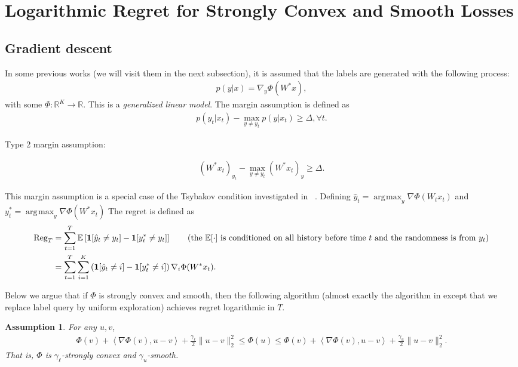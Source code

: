 \documentclass{article}
\newcommand{\Reg}{\text{\rm Reg}}
\newcommand{\one}{\boldsymbol{1}}
\newcommand{\nb}{\nabla}
\newcommand{\field}[1]{\mathbb{#1}}
\newcommand{\E}{\field{E}}
\newcommand{\inner}[1]{ \left\langle {#1} \right\rangle }
\newtheorem{assumption}{Assumption}
\DeclareMathOperator*{\argmax}{\arg\!\max}
\begin{document}
\section{Logarithmic Regret for Strongly Convex and Smooth Losses}
\subsection{Gradient descent}
In some previous works (we will visit them in the next subsection), it is assumed that the labels are generated with the following process: 
\begin{align}
    p(y|x) = \nabla_y\Phi(W^*x), 
\end{align}
with some $\Phi: \mathbb{R}^K \rightarrow \mathbb{R}$. This is a \textit{generalized linear model}.  
The margin assumption is defined as 
\begin{align}
    p(y_t|x_t) - \max_{y\neq y_t}p(y|x_t) \geq \Delta, \forall t.  \label{eqn:new margin}
\end{align}

{\color{blue} Type 2 margin assumption: }\\
{\color{blue} 
\begin{align}
    (W^*x_t)_{y_t} - \max_{y\neq y_t}(W^*x_t)_{y} \geq \Delta. 
\end{align}

}

This margin assumption is a special case of the Tsybakov condition investigated in ~\cite{agarwal2013selective}. 
Defining $\hat{y}_t = \argmax_y \nabla\Phi(W_tx_t)$ and $y^*_t = \argmax_y \nabla\Phi(W^*x_t) $ The regret is defined as
\begin{align}
    \Reg_T &= \sum_{t=1}^T \E\left[ \one[\hat{y}_t\neq y_t] - \one[y_t^*\neq y_t]\right] \tag{the $\E[\cdot]$ is conditioned on all history before time $t$ and the randomness is from $y_t$} \\
    &= \sum_{t=1}^T \sum_{i=1}^K \left(\one[\hat{y}_t\neq i] - \one[y^*_t\neq i]\right)\nabla_i\Phi(W^*x_t). \label{eqn:new regret}
\end{align}

Below we argue that if $\Phi$ is strongly convex and smooth, then the following algorithm (almost exactly the algorithm in \cite{agarwal2013selective} except that we replace label query by uniform exploration) achieves regret logarithmic in $T$. 

\begin{assumption}
For any $u,v$, 
\begin{align*}
     \Phi(v) + \inner{\nb\Phi(v),u-v} + \frac{\gamma_\ell}{2}\|u-v\|_2^2 \leq \Phi(u)\leq \Phi(v) + \inner{\nb\Phi(v),u-v} + \frac{\gamma_u}{2}\|u-v\|_2^2. 
\end{align*}
That is, $\Phi$ is $\gamma_\ell$-strongly convex and $\gamma_u$-smooth. 
\end{assumption}
\end{document}

